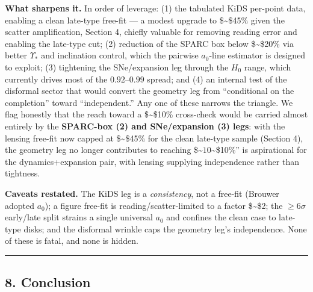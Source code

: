 \documentclass[
]{article}
\newcounter{none} %
\begin{document}
\textbf{What sharpens it.} In order of leverage: (1) the tabulated KiDS
per-point data, enabling a clean late-type free-fit --- a modest upgrade
to \$\sim\$45\% given the scatter amplification, Section 4, chiefly
valuable for removing reading error and enabling the late-type cut; (2)
reduction of the SPARC box below \$\sim\$20\% via better \(\Upsilon_*\)
and inclination control, which the pairwise \(a_0\)-line estimator is
designed to exploit; (3) tightening the SNe/expansion leg through the
\(H_0\) range, which currently drives most of the \(0.92\)--\(0.99\)
spread; and (4) an internal test of the disformal sector that would
convert the geometry leg from ``conditional on the completion'' toward
``independent.'' Any one of these narrows the triangle. We flag honestly
that the reach toward a \$\sim\$10\% cross-check would be carried almost
entirely by the \textbf{SPARC-box (2) and SNe/expansion (3) legs}: with
the lensing free-fit now capped at \$\sim\$45\% for the clean late-type
sample (Section 4), the geometry leg no longer contributes to reaching
\$\sim\(10%
\)\sim\$10\%'' is aspirational for the dynamics+expansion pair, with
lensing supplying independence rather than tightness.

\textbf{Caveats restated.} The KiDS leg is a \emph{consistency}, not a
free-fit (Brouwer adopted \(a_0\)); a figure free-fit is
reading/scatter-limited to a factor \$\sim\$2; the \(\ge6\sigma\)
early/late split strains a single universal \(a_0\) and confines the
clean case to late-type disks; and the disformal wrinkle caps the
geometry leg's independence. None of these is fatal, and none is hidden.

\begin{center}\rule{0.5\linewidth}{0.5pt}\end{center}

\subsection{8. Conclusion}\label{conclusion}
\end{document}
